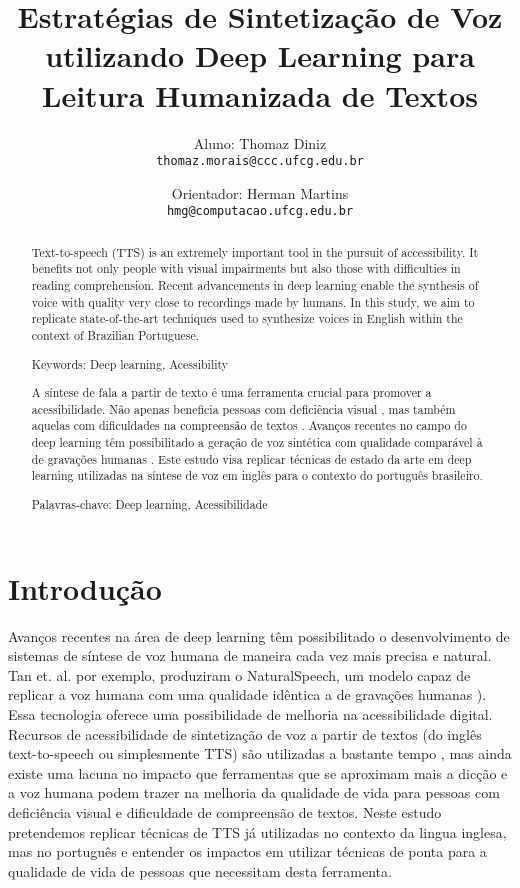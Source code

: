 \documentclass[a4paper,12pt]{article}
\title{Estratégias de Sintetização de Voz utilizando Deep Learning para Leitura Humanizada de Textos}
\author{
  Aluno: Thomaz Diniz\\
  \texttt{thomaz.morais@ccc.ufcg.edu.br}
  \and
  Orientador: Herman Martins\\
  \texttt{hmg@computacao.ufcg.edu.br}
}
\date{}
\begin{document}
	
	\maketitle
	\begin{abstract}
		Text-to-speech (TTS) is an extremely important tool in the pursuit of accessibility. It benefits not only people with visual impairments but also those with difficulties in reading comprehension. Recent advancements in deep learning enable the synthesis of voice with quality very close to recordings made by humans. In this study, we aim to replicate state-of-the-art techniques used to synthesize voices in English within the context of Brazilian Portuguese.
		
		Keywords: Deep learning, Acessibility
	\end{abstract}


	\begin{abstract}
		A síntese de fala a partir de texto é uma ferramenta crucial para promover a acessibilidade. Não apenas beneficia pessoas com deficiência visual \cite{}, mas também aquelas com dificuldades na compreensão de textos \cite{wood2017readingaccessibility}. Avanços recentes no campo do deep learning têm possibilitado a geração de voz sintética com qualidade comparável à de gravações humanas \cite{tan2022naturalspeech}. Este estudo visa replicar técnicas de estado da arte em deep learning utilizadas na síntese de voz em inglês para o contexto do português brasileiro.
		
		Palavras-chave: Deep learning, Acessibilidade
	\end{abstract}


	
	\section{Introdução}
	
		Avanços recentes na área de deep learning têm possibilitado o desenvolvimento de sistemas de síntese de voz humana de maneira cada vez mais precisa e natural. Tan et. al. por exemplo, produziram o NaturalSpeech, um modelo capaz de replicar a voz humana com uma qualidade idêntica a de gravações humanas \cite{tan2022naturalspeech}). Essa tecnologia oferece uma possibilidade de melhoria na acessibilidade digital. Recursos de acessibilidade de sintetização de voz a partir de textos (do inglês text-to-speech ou simplesmente TTS) são utilizadas a bastante tempo \cite{}, mas ainda existe uma lacuna no impacto que ferramentas que se aproximam mais a dicção e a voz humana podem trazer na melhoria da qualidade de vida para pessoas com deficiência visual e dificuldade de compreensão de textos. Neste estudo pretendemos replicar técnicas de TTS já utilizadas no contexto da lingua inglesa, mas no português e entender os impactos em utilizar técnicas de ponta para a qualidade de vida de pessoas que necessitam desta ferramenta.
	
\end{document}
